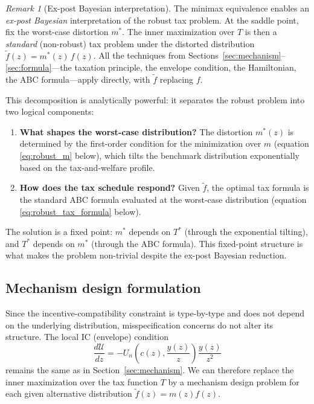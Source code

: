\documentclass[12pt,a4paper]{article}
\theoremstyle{definition}
\theoremstyle{plain}
\theoremstyle{remark}
\newtheorem{remark}{Remark}[section]
\newcommand{\calU}{\mathcal{U}}
\begin{document}
\begin{remark}[Ex-post Bayesian interpretation]
\label{rem:expost_bayesian}
The minimax equivalence enables an \emph{ex-post Bayesian} interpretation of the robust tax problem. At the saddle point, fix the worst-case distortion $m^*$. The inner maximization over $T$ is then a \emph{standard} (non-robust) tax problem under the distorted distribution $\widetilde{f}(z) = m^*(z)\,f(z)$. All the techniques from Sections~\ref{sec:mechanism}--\ref{sec:formula}---the taxation principle, the envelope condition, the Hamiltonian, the ABC formula---apply directly, with $\widetilde{f}$ replacing $f$.

This decomposition is analytically powerful: it separates the robust problem into two logical components:
\begin{enumerate}[label=(\roman*)]
  \item \textbf{What shapes the worst-case distribution?} The distortion $m^*(z)$ is determined by the first-order condition for the minimization over $m$ (equation \eqref{eq:robust_m} below), which tilts the benchmark distribution exponentially based on the tax-and-welfare profile.
  \item \textbf{How does the tax schedule respond?} Given $\widetilde{f}$, the optimal tax formula is the standard ABC formula evaluated at the worst-case distribution (equation \eqref{eq:robust_tax_formula} below).
\end{enumerate}
The solution is a fixed point: $m^*$ depends on $T^*$ (through the exponential tilting), and $T^*$ depends on $m^*$ (through the ABC formula). This fixed-point structure is what makes the problem non-trivial despite the ex-post Bayesian reduction.
\end{remark}

\subsection{Mechanism design formulation}
\label{sec:robust_mechanism}

Since the incentive-compatibility constraint is type-by-type and does not depend on the underlying distribution, misspecification concerns do not alter its structure. The local IC (envelope) condition
\[
  \frac{d\calU}{dz} = -U_n\!\left(c(z), \frac{y(z)}{z}\right) \frac{y(z)}{z^2}
\]
remains the same as in Section~\ref{sec:mechanism}. We can therefore replace the inner maximization over the tax function $T$ by a mechanism design problem for each given alternative distribution $\widetilde{f}(z) = m(z) f(z)$.
\end{document}
